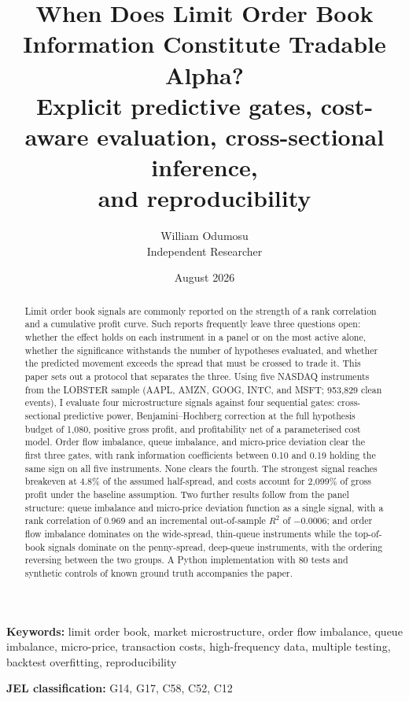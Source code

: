 \documentclass[11pt]{scrartcl}
\title{\textbf{When Does Limit Order Book Information Constitute Tradable Alpha?}\\[0.5em]
\large Explicit predictive gates, cost-aware evaluation, cross-sectional inference,\\and reproducibility}
\author{William Odumosu\\\normalsize Independent Researcher}
\date{August 2026}
\begin{document}
\maketitle

\begin{abstract}
Limit order book signals are commonly reported on the strength of a rank correlation and a cumulative profit curve. Such reports frequently leave three questions open: whether the effect holds on each instrument in a panel or on the most active alone, whether the significance withstands the number of hypotheses evaluated, and whether the predicted movement exceeds the spread that must be crossed to trade it. This paper sets out a protocol that separates the three. Using five NASDAQ instruments from the LOBSTER sample (AAPL, AMZN, GOOG, INTC, and MSFT; 953{,}829 clean events), I evaluate four microstructure signals against four sequential gates: cross-sectional predictive power, Benjamini--Hochberg correction at the full hypothesis budget of 1{,}080, positive gross profit, and profitability net of a parameterised cost model. Order flow imbalance, queue imbalance, and micro-price deviation clear the first three gates, with rank information coefficients between 0.10 and 0.19 holding the same sign on all five instruments. None clears the fourth. The strongest signal reaches breakeven at 4.8\% of the assumed half-spread, and costs account for 2{,}099\% of gross profit under the baseline assumption. Two further results follow from the panel structure: queue imbalance and micro-price deviation function as a single signal, with a rank correlation of 0.969 and an incremental out-of-sample $R^2$ of $-0.0006$; and order flow imbalance dominates on the wide-spread, thin-queue instruments while the top-of-book signals dominate on the penny-spread, deep-queue instruments, with the ordering reversing between the two groups. A Python implementation with 80 tests and synthetic controls of known ground truth accompanies the paper.
\end{abstract}

\vspace{0.5em}
\noindent\textbf{Keywords:} limit order book, market microstructure, order flow imbalance, queue imbalance, micro-price, transaction costs, high-frequency data, multiple testing, backtest overfitting, reproducibility

\noindent\textbf{JEL classification:} G14, G17, C58, C52, C12
\end{document}
